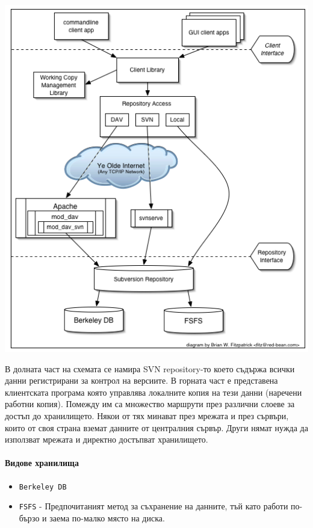 \documentclass[a4paper]{article}
\begin{document}
    \includegraphics[scale=0.5]{svn_architecture}

    В долната част на схемата се намира SVN repository-то което съдържа всички
    данни регистрирани за контрол на версиите. В горната част е представена
    клиентската програма която управлява локалните копия на тези данни
    (наречени работни копия). Помежду им са множество маршрути през различни
    слоеве за достъп до хранилището. Някои от тях минават през мрежата и през
    сървъри, които от своя страна вземат данните от централния сървър. Други
    нямат нужда да използват мрежата и директно достъпват хранилището.

    \paragraph{Видове хранилища}

    \begin{itemize}
      \item \texttt{Berkeley DB}
      \item \texttt{FSFS} - Предпочитаният метод за съхранение на данните, тъй като работи по-бързо и заема по-малко място на диска.
    \end{itemize}
\end{document}
